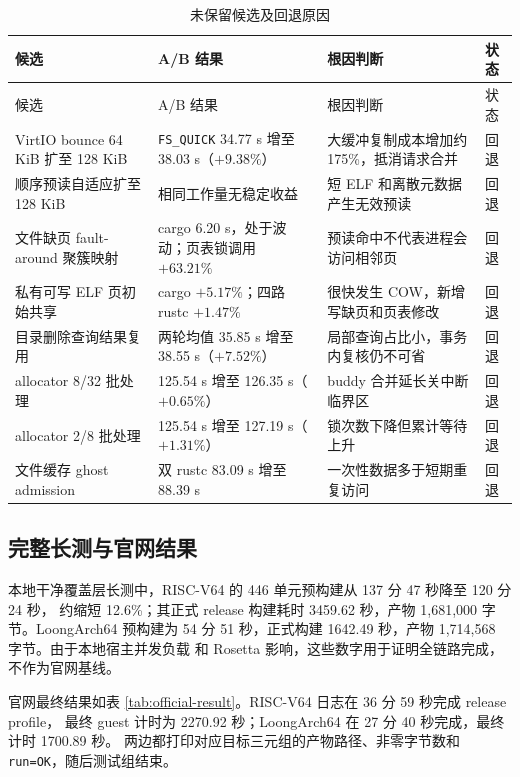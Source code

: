 \documentclass[UTF8,zihao=-4]{ctexart}
\newcommand{\code}{\nolinkurl}
\newcommand{\reverted}{\textcolor{ScintillaRed}{回退}}
\begin{document}
\begin{longtable}{p{}p{}p{}p{}}
\caption{未保留候选及回退原因}\label{tab:reverted}\\
\toprule
候选 & A/B 结果 & 根因判断 & 状态 \\
\midrule
\endfirsthead
\toprule
候选 & A/B 结果 & 根因判断 & 状态 \\
\midrule
\endhead
VirtIO bounce 64 KiB 扩至 128 KiB & \code{FS_QUICK} 34.77 s 增至 38.03 s（$+9.38\%$） & 大缓冲复制成本增加约 175\%，抵消请求合并 & \reverted \\
顺序预读自适应扩至 128 KiB & 相同工作量无稳定收益 & 短 ELF 和离散元数据产生无效预读 & \reverted \\
文件缺页 fault-around 聚簇映射 & cargo 6.20 s，处于波动；页表锁调用 $+63.21\%$ & 预读命中不代表进程会访问相邻页 & \reverted \\
私有可写 ELF 页初始共享 & cargo $+5.17\%$；四路 rustc $+1.47\%$ & 很快发生 COW，新增写缺页和页表修改 & \reverted \\
目录删除查询结果复用 & 两轮均值 35.85 s 增至 38.55 s（$+7.52\%$） & 局部查询占比小，事务内复核仍不可省 & \reverted \\
allocator 8/32 批处理 & 125.54 s 增至 126.35 s（$+0.65\%$） & buddy 合并延长关中断临界区 & \reverted \\
allocator 2/8 批处理 & 125.54 s 增至 127.19 s（$+1.31\%$） & 锁次数下降但累计等待上升 & \reverted \\
文件缓存 ghost admission & 双 rustc 83.09 s 增至 88.39 s & 一次性数据多于短期重复访问 & \reverted \\
\bottomrule
\end{longtable}

\subsection{完整长测与官网结果}

本地干净覆盖层长测中，RISC-V64 的 446 单元预构建从 137 分 47 秒降至 120 分 24 秒，
约缩短 12.6\%；其正式 release 构建耗时 3459.62 秒，产物 1,681,000 字节。LoongArch64
预构建为 54 分 51 秒，正式构建 1642.49 秒，产物 1,714,568 字节。由于本地宿主并发负载
和 Rosetta 影响，这些数字用于证明全链路完成，不作为官网基线。

官网最终结果如表 \ref{tab:official-result}。RISC-V64 日志在 36 分 59 秒完成 release profile，
最终 guest 计时为 2270.92 秒；LoongArch64 在 27 分 40 秒完成，最终计时 1700.89 秒。
两边都打印对应目标三元组的产物路径、非零字节数和 \code{run=OK}，随后测试组结束。
\end{document}
